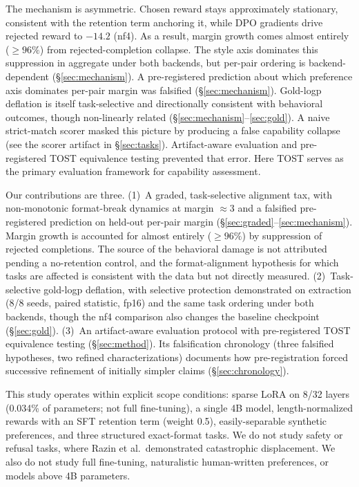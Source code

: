 \documentclass{article}
\begin{document}
The mechanism is asymmetric. Chosen reward stays approximately stationary, consistent with the retention term anchoring it, while DPO gradients drive rejected reward to $-14.2$ (nf4). As a result, margin growth comes almost entirely (${\geq}96\%$) from rejected-completion collapse. The style axis dominates this suppression in aggregate under both backends, but per-pair ordering is backend-dependent (\S\ref{sec:mechanism}). A pre-registered prediction about which preference axis dominates per-pair margin was falsified (\S\ref{sec:mechanism}). Gold-logp deflation is itself task-selective and directionally consistent with behavioral outcomes, though non-linearly related (\S\ref{sec:mechanism}--\ref{sec:gold}). A naive strict-match scorer masked this picture by producing a false capability collapse (see the scorer artifact in \S\ref{sec:tasks}). Artifact-aware evaluation and pre-registered TOST equivalence testing prevented that error. Here TOST serves as the primary evaluation framework for capability assessment.

Our contributions are three. (1)~A graded, task-selective alignment tax, with non-monotonic format-break dynamics at margin ${\approx}3$ and a falsified pre-registered prediction on held-out per-pair margin (\S\ref{sec:graded}--\ref{sec:mechanism}). Margin growth is accounted for almost entirely (${\geq}96\%$) by suppression of rejected completions. The source of the behavioral damage is not attributed pending a no-retention control, and the format-alignment hypothesis for which tasks are affected is consistent with the data but not directly measured. (2)~Task-selective gold-logp deflation, with selective protection demonstrated on extraction (8/8 seeds, paired statistic, fp16) and the same task ordering under both backends, though the nf4 comparison also changes the baseline checkpoint (\S\ref{sec:gold}). (3)~An artifact-aware evaluation protocol with pre-registered TOST equivalence testing (\S\ref{sec:method}). Its falsification chronology (three falsified hypotheses, two refined characterizations) documents how pre-registration forced successive refinement of initially simpler claims (\S\ref{sec:chronology}).

This study operates within explicit scope conditions: sparse LoRA on 8/32 layers (0.034\% of parameters; not full fine-tuning), a single 4B model, length-normalized rewards with an SFT retention term (weight 0.5), easily-separable synthetic preferences, and three structured exact-format tasks. We do not study safety or refusal tasks, where Razin et al.\ demonstrated catastrophic displacement. We also do not study full fine-tuning, naturalistic human-written preferences, or models above 4B parameters.
\end{document}
